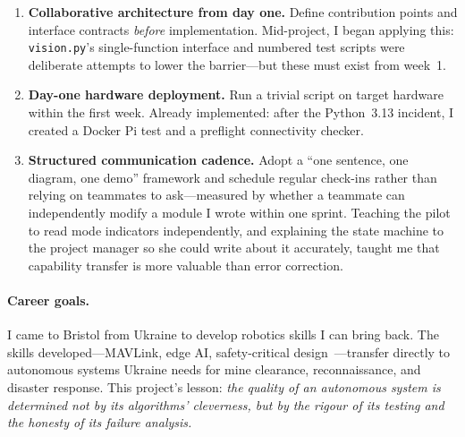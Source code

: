 \begin{enumerate}
  \item \textbf{Collaborative architecture from day one.} Define contribution points and interface contracts \textit{before} implementation. Mid-project, I began applying this: \texttt{vision.py}'s single-function interface and numbered test scripts were deliberate attempts to lower the barrier---but these must exist from week~1.

  \item \textbf{Day-one hardware deployment.} Run a trivial script on target hardware within the first week. Already implemented: after the Python~3.13 incident, I created a Docker Pi test and a preflight connectivity checker.

  \item \textbf{Structured communication cadence.} Adopt a ``one sentence, one diagram, one demo'' framework and schedule regular check-ins rather than relying on teammates to ask---measured by whether a teammate can independently modify a module I wrote within one sprint. Teaching the pilot to read mode indicators independently, and explaining the state machine to the project manager so she could write about it accurately, taught me that capability transfer is more valuable than error correction.
\end{enumerate}

\paragraph{Career goals.} I came to Bristol from Ukraine to develop robotics skills I can bring back. The skills developed---MAVLink, edge AI, safety-critical design~\cite{leveson2011}---transfer directly to autonomous systems Ukraine needs for mine clearance, reconnaissance, and disaster response. This project's lesson: \textit{the quality of an autonomous system is determined not by its algorithms' cleverness, but by the rigour of its testing and the honesty of its failure analysis.}
